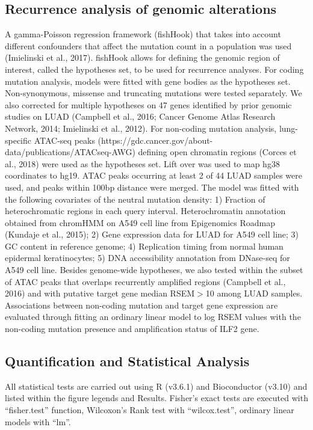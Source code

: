 \documentclass[phd,tocprelim]{cornell}
\begin{document}
\subsection*{Recurrence analysis of genomic alterations}
A gamma-Poisson regression framework (fishHook) that takes into account different confounders that affect the mutation count in a population was used (Imielinski et al., 2017). fishHook allows for defining the genomic region of interest, called the hypotheses set, to be used for recurrence analyses. For coding mutation analysis, models were fitted with gene bodies as the hypotheses set. Non-synonymous, missense and truncating mutations were tested separately. We also corrected for multiple hypotheses on 47 genes identified by prior genomic studies on LUAD (Campbell et al., 2016; Cancer Genome Atlas Research Network, 2014; Imielinski et al., 2012). For non-coding mutation analysis, lung-specific ATAC-seq peaks (https://gdc.cancer.gov/about-data/publications/ATACseq-AWG) defining open chromatin regions (Corces et al., 2018) were used as the hypotheses set. Lift over was used to map hg38 coordinates to hg19. ATAC peaks occurring at least 2 of 44 LUAD samples were used, and peaks within 100bp distance were merged. The model was fitted with the following covariates of the neutral mutation density: 1) Fraction of heterochromatic regions in each query interval. Heterochromatin annotation obtained from chromHMM on A549 cell line from Epigenomics Roadmap (Kundaje et al., 2015); 2) Gene expression data for LUAD for A549 cell line; 3) GC content in reference genome; 4) Replication timing from normal human epidermal keratinocytes; 5) DNA accessibility annotation from DNase-seq for A549 cell line. Besides genome-wide hypotheses, we also tested within the subset of ATAC peaks that overlaps recurrently amplified regions (Campbell et al., 2016) and with putative target gene median RSEM$>$10 among LUAD samples.
Associations between non-coding mutation and target gene expression are evaluated through fitting an ordinary linear model to log RSEM values with the non-coding mutation presence and amplification status of ILF2 gene.

\subsection*{Quantification and Statistical Analysis}
All statistical tests are carried out using R (v3.6.1) and Bioconductor (v3.10) and listed within the figure legends and Results. Fisher’s exact tests are executed with “fisher.test” function, Wilcoxon’s Rank test with “wilcox.test”, ordinary linear models with “lm”.


\end{document}
